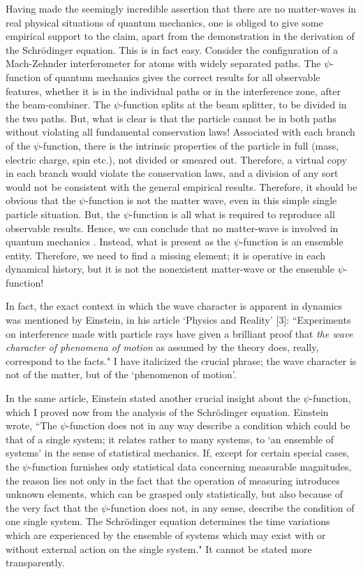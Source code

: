 Having made the seemingly incredible assertion that there are no matter-waves in real
physical situations of quantum mechanics, one is obliged to give some empirical support to
the claim, apart from the demonstration in the derivation of the Schrödinger equation. This
is in fact easy. Consider the configuration of a Mach-Zehnder interferometer for atoms with
widely separated paths. The $\psi$-function of quantum mechanics gives the correct results for
all observable features, whether it is in the individual paths or in the interference zone, after
the beam-combiner. The $\psi$-function splits at the beam splitter, to be divided in the two
paths. But, what is clear is that the particle cannot be in both paths without violating
all fundamental conservation laws! Associated with each branch of the $\psi$-function, there is
the intrinsic properties of the particle in full (mass, electric charge, spin etc.), not divided
or smeared out. Therefore, a virtual copy in each branch would violate the conservation
laws, and a division of any sort would not be consistent with the general empirical results.
Therefore, it should be obvious that the $\psi$-function is not the matter wave, even in this
simple single particle situation. But, the $\psi$-function is all what is required to reproduce
all observable results. Hence, we can conclude that no matter-wave is involved in quantum
mechanics \cite{chap27-key2}. Instead, what is present as the $\psi$-function is an ensemble entity. Therefore,
we need to find a missing element; it is operative in each dynamical history, but it is not
the nonexistent matter-wave or the ensemble $\psi$-function!

In fact, the exact context in which the wave character is apparent in dynamics was
mentioned by Einstein, in his article `Physics and Reality' [3]: ``Experiments on interference
made with particle rays have given a brilliant proof that \textit{the wave character of phenomena of
motion} as assumed by the theory does, really, correspond to the facts." I have italicized the
crucial phrase; the wave character is not of the matter, but of the `phenomenon of motion'.

In the same article, Einstein stated another crucial insight about the $\psi$-function, which I
proved now from the analysis of the Schrödinger equation. Einstein wrote, “The $\psi$-function
does not in any way describe a condition which could be that of a single system; it relates
rather to many systems, to `an ensemble of systems' in the sense of statistical mechanics.
If, except for certain special cases, the $\psi$-function furnishes only statistical data concerning
measurable magnitudes, the reason lies not only in the fact that the operation of measuring
introduces unknown elements, which can be grasped only statistically, but also because of
the very fact that the $\psi$-function does not, in any sense, describe the condition of one single
system. The Schr\"{o}dinger equation determines the time variations which are experienced
by the ensemble of systems which may exist with or without external action on the single
system." It cannot be stated more transparently.

